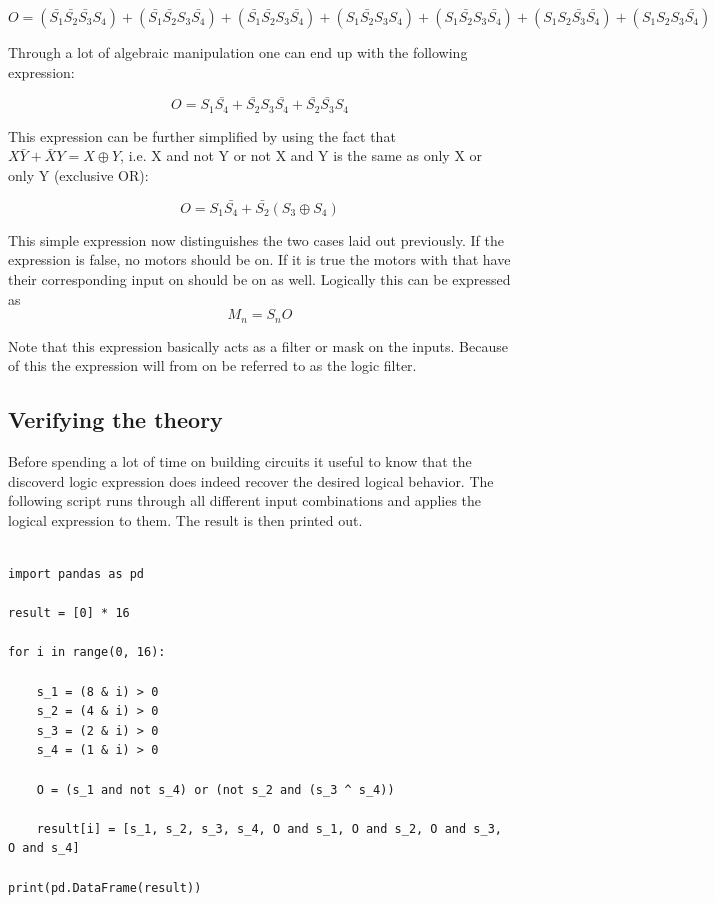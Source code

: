 \documentclass[14pt]{article}
\begin{document}
$$
O = (\bar{S_1}\bar{S_2}\bar{S_3}S_4)+(\bar{S_1}\bar{S_2}S_3\bar{S_4})+(\bar{S_1}\bar{S_2}S_3\bar{S_4})+(S_1\bar{S_2}S_3S_4)+(S_1\bar{S_2}S_3\bar{S_4})+(S_1S_2\bar{S_3}\bar{S_4})+(S_1S_2S_3\bar{S_4})
$$

Through a lot of algebraic manipulation one can end up with the following expression:

$$
O = S_1\bar{S_4} + \bar{S_2}S_3\bar{S_4}+\bar{S_2}\bar{S_3}S_4
$$

This expression can be further simplified by using the fact that $X\bar{Y}+\bar{X}Y = X \oplus Y$, i.e. X and not Y or not X and Y is the same
as only X or only Y (exclusive OR):

\begin{equation}
O = S_1\bar{S_4} + \bar{S_2}(S_3 \oplus S_4)
\label{eq:logic_filter}
\end{equation}

This simple expression now distinguishes the two cases laid out previously. If the expression is false, no motors should be on. If it is true
the motors with that have their corresponding input on should be on as well. Logically this can be expressed as 
$$
M_n = S_nO
$$

Note that this expression basically acts as a filter or mask on
the inputs. Because of this the expression will from on be referred to as the logic filter.


\clearpage
\subsection{Verifying the theory}

Before spending a lot of time on building circuits it useful to know that the discoverd logic expression does indeed recover the desired logical behavior.
The following script runs through all different input combinations and applies the logical expression to them. The result is then printed out.

\begin{verbatim}

import pandas as pd

result = [0] * 16

for i in range(0, 16):

    s_1 = (8 & i) > 0
    s_2 = (4 & i) > 0
    s_3 = (2 & i) > 0
    s_4 = (1 & i) > 0
    
    O = (s_1 and not s_4) or (not s_2 and (s_3 ^ s_4))

    result[i] = [s_1, s_2, s_3, s_4, O and s_1, O and s_2, O and s_3, O and s_4]

print(pd.DataFrame(result))

\end{verbatim}
\end{document}
